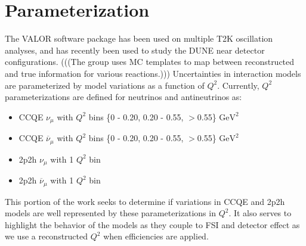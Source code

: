 \documentclass[12pt]{article}
\begin{document}
\section{Parameterization}
The VALOR software package has been used on multiple T2K oscillation analyses, and has recently been used to study the DUNE near detector configurations. (((The group uses MC templates to map between reconstructed and true information for various reactions.))) Uncertainties in interaction models are parameterized by model variations as a function of $Q^2$. Currently, $Q^2$ parameterizations are defined for neutrinos and antineutrinos as: 
\begin{itemize}
\item CCQE $\nu_{\mu}$ with $Q^2$ bins \{0 - 0.20, 0.20 - 0.55, $>$0.55\} $\textrm{GeV}^2$
\item CCQE $\overline{\nu}_{\mu}$ with $Q^2$ bins \{0 - 0.20, 0.20 - 0.55, $>$0.55\} $\textrm{GeV}^2$
\item 2p2h $\nu_{\mu}$ with 1 $Q^2$ bin 
\item 2p2h $\overline{\nu}_{\mu}$ with 1 $Q^2$ bin
\end{itemize}

This portion of the work seeks to determine if variations in CCQE and 2p2h models are well represented by these parameterizations in $Q^2$. It also serves to highlight the behavior of the models as they couple to FSI and detector effect as we use a reconstructed $Q^2$ when efficiencies are applied.
\end{document}
